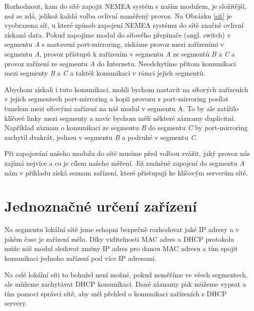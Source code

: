 \documentclass[thesis=B,czech,hidelinks]{FITthesis}[2019/03/21]
\begin{document}
    Rozhodnout, kam do sítě zapojit NEMEA systém s naším modulem, je složitější, než se zdá, jelikož každá volba ovlivní naměřený provoz. Na Obrázku \ref{sit} je vyobrazena síť, u které způsob zapojení NEMEA systému do sítě značně ovlivní získaná data. Pokud zapojíme modul do síťového přepínače (angl. switch) v segmentu \emph{A} s nastavení port-mirroring, získáme provoz mezi zařízeními v segmentu \emph{A}, provoz přístupů k zařízením  v segmentu \emph{A} ze segmentů \emph{B} a \emph{C} a provoz zařízení ze segmentu  \emph{A} do Internetu. Neodchytíme přitom komunikaci mezi segmenty \emph{B} a \emph{C} a taktéž komunikaci v rámci jejich segmentů. 
    
    Abychom získali i tuto komunikaci, mohli bychom nastavit na síťových zařízeních v jejich segmentech port-mirroring a kopii provozu z port-mirroring posílat tunelem mezi síťovými zařízení na náš modul v segmentu A. To by ale zatížilo klíčové linky mezi segmenty a navíc bychom měli některé záznamy duplicitní. Například záznam o komunikaci ze segmentu \emph{B} do segmentu \emph{C} by port-mirroring zachytil dvakrát, jednou v segmentu \emph{B} a podruhé v segmentu \emph{C}.
    
    Při zapojování našeho modulu do sítě musíme před volbou zvážit, jaký provoz nás zajímá nejvíce a co je cílem našeho měření. Již zmíněné zapojení do segmentu \emph{A} nám v příkladu získá seznam zařízení, které přistupují ke klíčovým serverům sítě.
    
    \section{Jednoznačné určení zařízení}
    Na segmentu lokální sítě jsme schopni bezpečně rozhodovat jaké IP adresy a v jakém čase je zařízení mělo. Díky viditelnosti MAC adres a DHCP protokolu může náš modul sledovat změny IP adres pro danou MAC adresu a tím spojit komunikaci jednoho zařízení pod více IP adresami.
    
    Na celé lokální síti to bohužel není možné, pokud neměříme ve všech segmentech, ale můžeme zachytávat DHCP komunikaci. Dané záznamy pak můžeme vypsat a tím pomoci správci sítě, aby měl přehled o komunikaci zařízeních s DHCP servery.
    
    
\end{document}
